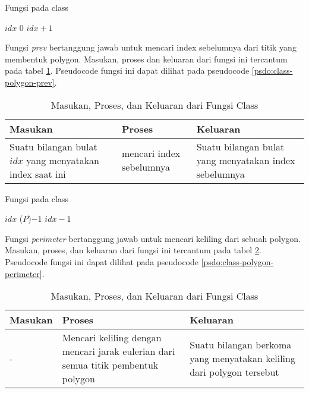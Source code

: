 \begin{algorithm}
    \caption{Fungsi  pada class }
	\label{psdo:class-polygon-next}
	\begin{algorithmic}[1]
        \Require $ idx $
            \State \Return $0$
        \Else
            \State \Return $idx+1$
		\EndIf
	\end{algorithmic}
\end{algorithm}

Fungsi \textit{prev} bertanggung jawab untuk mencari index sebelumnya dari titik yang membentuk polygon. Masukan, proses dan keluaran dari fungsi ini tercantum pada tabel \ref{tab:class-polygon-prev}. Pseudocode fungsi ini dapat dilihat pada pseudocode \ref{psdo:class-polygon-prev}.

\begin{table}[htb]
	\Centering
	\caption{Masukan, Proses, dan Keluaran dari Fungsi  Class }
	\begin{tabular}{|p{3cm}|p{3cm}|p{3cm}|}
	\hline
	Masukan   & Proses     & Keluaran \\ \hline
	Suatu bilangan bulat $idx$ yang menyatakan index saat ini & mencari index sebelumnya &   Suatu bilangan bulat yang menyatakan index sebelumnya     \\ \hline
	\end{tabular}
	\label{tab:class-polygon-prev}
\end{table}

\begin{algorithm}
    \caption{Fungsi  pada class }
	\label{psdo:class-polygon-prev}
	\begin{algorithmic}[1]
        \Require $ idx $
            \State \Return {}($P$)$-1$
        \Else
            \State \Return $idx-1$
		\EndIf
	\end{algorithmic}
\end{algorithm}

Fungsi \textit{perimeter} bertanggung jawab untuk mencari keliling dari sebuah polygon. Masukan, proses, dan keluaran dari fungsi ini tercantum pada tabel \ref{tab:class-polygon-perimeter}. Pseudocode fungsi ini dapat dilihat pada pseudocode \ref{psdo:class-polygon-perimeter}.
\begin{table}[htb]
	\Centering
	\caption{Masukan, Proses, dan Keluaran dari Fungsi  Class }
	\begin{tabular}{|p{3cm}|p{3cm}|p{3cm}|}
	\hline
	Masukan   & Proses     & Keluaran \\ \hline
	- & Mencari keliling dengan mencari jarak eulerian dari semua titik pembentuk polygon &   Suatu bilangan berkoma yang menyatakan keliling dari polygon tersebut     \\ \hline
	\end{tabular}
	\label{tab:class-polygon-perimeter}
\end{table}


